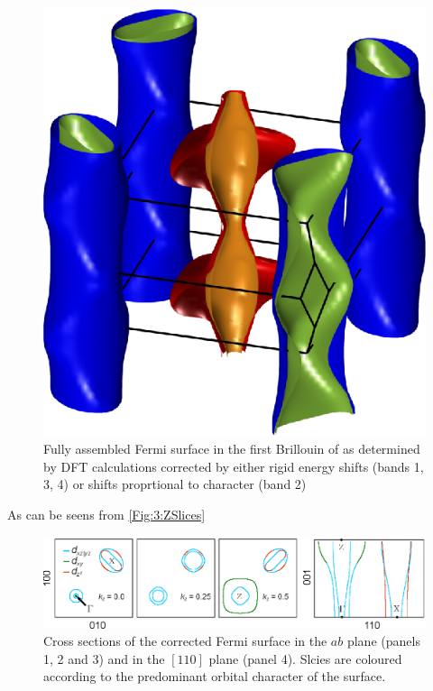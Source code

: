 \begin{figure}[h!]
    \begin{center}
        \includegraphics[scale=0.7]{Chapter3-dHvABaFe2P2/Figures/AngleDepMeasurements/BandCharacterFermiSurface/FullBandCharacterFermiSurface}
        \caption{Fully assembled Fermi surface in the first Brillouin of \BaFeP as determined by DFT calculations corrected by either rigid energy shifts (bands 1, 3, 4) or shifts proprtional to \DzTwo character (band 2)}
        \label{Fig:3:FullBandCharacterFermiSurface}
    \end{center}
\end{figure}

As can be seens from \fig\ref{Fig:3:ZSlices}
\begin{figure}[h!]
    \begin{center}
        \includegraphics[scale=0.7]{Chapter3-dHvABaFe2P2/Figures/AngleDepMeasurements/ZSlices/ZSlices}
        \caption{Cross sections of the corrected Fermi surface in the $ab$ plane (panels 1, 2 and 3) and in the $[110]$ plane (panel 4). Slcies are coloured according to the predominant orbital character of the surface.}
        \label{Fig:3:FullBandCharacterFermiSurface}
    \end{center}
\end{figure}

